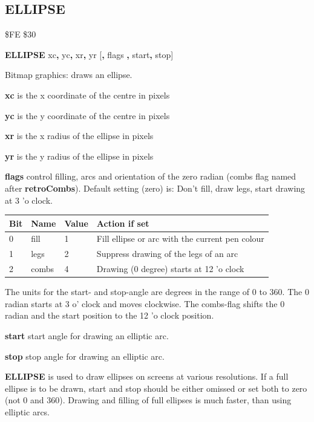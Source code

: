 \subsection{ELLIPSE}
\begin{description}[leftmargin=2cm,style=nextline]
\item [Token:] \$FE \$30
\item [Format:] {\bf ELLIPSE} xc{\bf,} yc{\bf,} xr{\bf,} yr
		[{\bf,} flags {\bf,} start{\bf,} stop]
\item [Usage:] Bitmap graphics: draws an ellipse.

               {\bf xc} is the x coordinate of the centre in pixels

               {\bf yc} is the y coordinate of the centre in pixels

               {\bf xr} is the x radius of the ellipse in pixels

               {\bf yr} is the y radius of the ellipse in pixels

               {\bf flags} control filling, arcs and orientation
               of the zero radian (combs flag named after {\bf retroCombs}).
               Default setting (zero) is: Don't fill, draw legs,
               start drawing at 3 'o clock.

{\setlength{\tabcolsep}{1.5mm}
\begin{tabular}{|l|l|l|l|}
\hline
{\bf Bit}  & {\bf Name} & {\bf Value} & {\bf Action if set} \\
\hline
  0 & fill  & 1  & Fill ellipse or arc with the current pen colour \\
  1 & legs  & 2  & Suppress drawing of the legs of an arc \\
  2 & combs & 4  & Drawing (0 degree) starts at 12 'o clock \\
\hline
\end{tabular}
}

               The units for the start- and stop-angle are degrees
               in the range of 0 to 360. The 0 radian starts
               at 3 o' clock and moves clockwise. The combs-flag
               shifts the 0 radian and the start position to the
               12 'o clock position.

               {\bf start} start angle for drawing an elliptic arc.

               {\bf stop} stop angle for drawing an elliptic arc.

\item [Remarks:] {\bf ELLIPSE} is used to draw ellipses on
               screens at various resolutions.
               If a full ellipse is to be drawn, start and stop should
               be either omissed or set both to zero
               (not 0 and 360). Drawing and filling of full ellipses is
               much faster, than using elliptic arcs.


\end{description}
